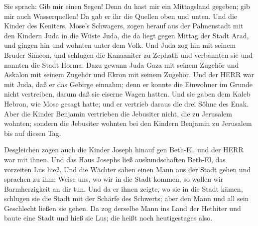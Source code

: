  Sie sprach: Gib mir einen Segen! Denn du hast mir ein
Mittagsland gegeben; gib mir auch Wasserquellen! Da gab er ihr die
Quellen oben und unten.  Und die Kinder des Keniters,
Mose's Schwagers, zogen herauf aus der Palmenstadt mit den Kindern Juda
in die Wüste Juda, die da liegt gegen Mittag der Stadt Arad, und gingen
hin und wohnten unter dem Volk.  Und Juda zog hin mit
seinem Bruder Simeon, und schlugen die Kanaaniter zu Zephath und
verbannten sie und nannten die Stadt Horma.  Dazu gewann
Juda Gaza mit seinem Zugehör und Askalon mit seinem Zugehör und Ekron
mit seinem Zugehör.  Und der HERR war mit Juda, daß er das
Gebirge einnahm; denn er konnte die Einwohner im Grunde nicht
vertreiben, darum daß sie eiserne Wagen hatten.  Und sie
gaben dem Kaleb Hebron, wie Mose gesagt hatte; und er vertrieb daraus
die drei Söhne des Enak.  Aber die Kinder Benjamin
vertrieben die Jebusiter nicht, die zu Jerusalem wohnten; sondern die
Jebusiter wohnten bei den Kindern Benjamin zu Jerusalem bis auf diesen
Tag.

 Desgleichen zogen auch die Kinder Joseph hinauf gen
Beth-El, und der HERR war mit ihnen.  Und das Haus Josephs
ließ auskundschaften Beth-El, das vorzeiten Lus hieß.  Und
die Wächter sahen einen Mann aus der Stadt gehen und sprachen zu ihm:
Weise uns, wo wir in die Stadt kommen, so wollen wir Barmherzigkeit an
dir tun.  Und da er ihnen zeigte, wo sie in die Stadt
kämen, schlugen sie die Stadt mit der Schärfe des Schwerts; aber den
Mann und all sein Geschlecht ließen sie gehen.  Da zog
derselbe Mann ins Land der Hethiter und baute eine Stadt und hieß sie
Lus; die heißt noch heutigestages also.

